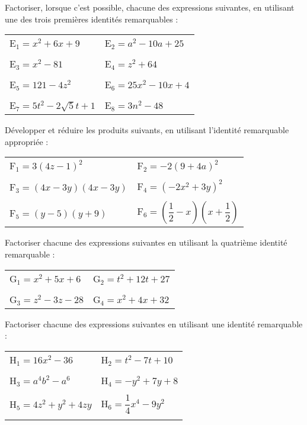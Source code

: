 \begin{exercice}[]
Factoriser, lorsque c'est possible, chacune des expressions suivantes, en utilisant une des trois premières identités remarquables :

\vspace{0.25cm}
\begin{tabular}{m{3.75cm}m{3.75cm}}
E$_1=x^2+6x+9$ & E$_2=a^2-10a+25$\\
&\\
E$_3=x^2-81$ & E$_4=z^2+64$\\
&\\
E$_5=121-4z^2$ & E$_6=25x^2-10x+4$\\
&\\
E$_7=5t^2-2\sqrt{5}t+1$ & E$_8=3n^2-48$\\
\end{tabular}
\end{exercice}

\begin{exercice}[]
Développer et réduire les produits suivants, en utilisant l'identité remarquable appropriée :

\vspace{0.25cm}
\begin{tabular}{m{3.75cm}m{3.75cm}}
F$_1=3(4z-1)^2$ & F$_{2}=-2(9+4a)^2$\\
&\\
F$_3=(4x-3y)(4x-3y)$ & F$_{4}=(-2x^2+3y)^2$\\
&\\
F$_{5}=(y-5)(y+9)$ & {\scriptsize F$_{6}=\left(\dfrac{1}{2}-x\right)\left(x+\dfrac{1}{2}\right)$}\\
\end{tabular}
\end{exercice}

\begin{exercice}[]
Factoriser chacune des expressions suivantes en utilisant la quatrième identité remarquable :

\begin{tabular}{m{3.75cm}m{3.75cm}}
G$_1=x^2+5x+6$ & G$_2=t^2+12t+27$\\
&\\
G$_3=z^2-3z-28$ & G$_4=x^2+{4}x+32$\\
\end{tabular}
\end{exercice}

\begin{exercice}[]
Factoriser chacune des expressions suivantes en utilisant une identité remarquable :

\vspace{0.25cm}
\begin{tabular}{m{3.75cm}m{3.75cm}}
H$_1=16x^2-36$ & H$_2=t^2-7t+10$\\
&\\
H$_3=a^4b^2-a^6$ & H$_4=-y^2+{7}y+8$\\
&\\
H$_5=4z^2+y^2+4zy$ & H$_6=\dfrac{1}{4}x^4-9y^2$\\\\
\end{tabular}
\end{exercice}

